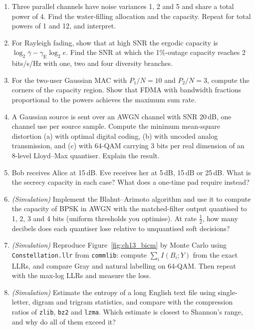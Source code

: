 \begin{enumerate}[label=\thechapter.\arabic*]
the capacity of the tone? How many such tones are needed for 8\,Mb/s?
\item Three parallel channels have noise variances 1, 2 and 5 and share a total power of 4. Find the
water-filling allocation and the capacity. Repeat for total powers of 1 and 12, and interpret.
\item For Rayleigh fading, show that at high SNR the ergodic capacity is
$\log_2\bar\gamma-\gamma_{\mathrm{E}}\log_2e$. Find the SNR at which the 1\%-outage capacity reaches
2\,bits/s/Hz with one, two and four diversity branches.
\item For the two-user Gaussian MAC with $P_1/N=10$ and $P_2/N=3$, compute the corners of the capacity
region. Show that FDMA with bandwidth fractions proportional to the powers achieves the maximum sum
rate.
\item A Gaussian source is sent over an AWGN channel with SNR 20\,dB, one channel use per source
sample. Compute the minimum mean-square distortion (a) with optimal digital coding, (b) with uncoded
analog transmission, and (c) with 64-QAM carrying 3 bits per real dimension of an 8-level Lloyd--Max
quantiser. Explain the result.
\item Bob receives Alice at 15\,dB. Eve receives her at 5\,dB, 15\,dB or 25\,dB. What is the secrecy
capacity in each case? What does a one-time pad require instead?
\item \emph{(Simulation)} Implement the Blahut--Arimoto algorithm and use it to compute the capacity of
BPSK in AWGN with the matched-filter output quantised to 1, 2, 3 and 4 bits (uniform thresholds you
optimise). At rate $\frac12$, how many decibels does each quantiser lose relative to unquantised soft
decisions?
\item \emph{(Simulation)} Reproduce Figure~\ref{fig:ch13_bicm} by Monte Carlo using
\texttt{Constellation.llr} from \texttt{commlib}: compute $\sum_iI(B_i;Y)$ from the exact LLRs, and
compare Gray and natural labelling on 64-QAM. Then repeat with the max-log LLRs and measure the loss.
\item \emph{(Simulation)} Estimate the entropy of a long English text file using single-letter,
digram and trigram statistics, and compare with the compression ratios of \texttt{zlib},
\texttt{bz2} and \texttt{lzma}. Which estimate is closest to Shannon's range, and why do all of them
exceed it?
\end{enumerate}

